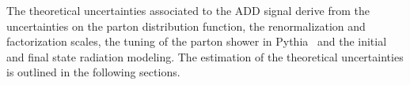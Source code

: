 The theoretical uncertainties associated to the ADD signal derive from the
uncertainties on the parton distribution function, the renormalization and
factorization scales, the tuning of the parton shower in
Pythia~\cite{PythiaManual} and the initial and final state radiation
modeling. The estimation of the theoretical uncertainties is outlined in the
following sections.
